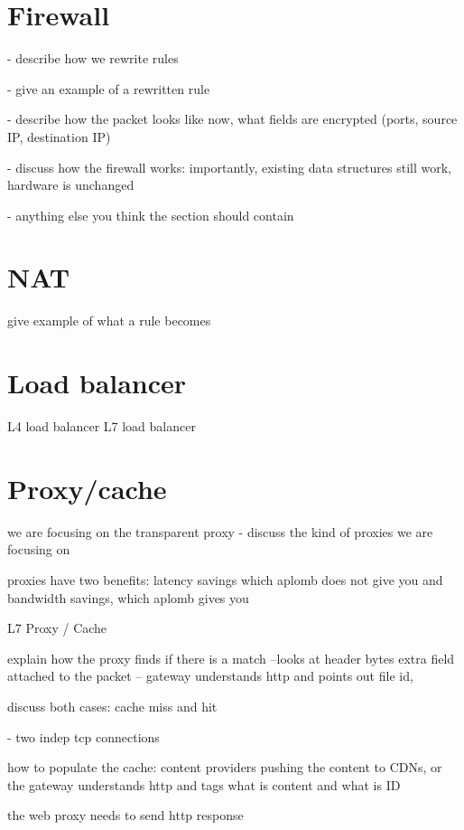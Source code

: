 
\section{Firewall}\label{sec:firewall}

- describe how we rewrite rules 

- give an example of a rewritten rule

- describe how the packet looks like now, what fields are encrypted (ports, source IP, destination IP)

- discuss how the firewall works: importantly, existing data structures still work, hardware is unchanged

- anything else you think the section should contain

\section{NAT}\label{sec:nat}

give example of what a rule becomes

\section{Load balancer}\label{sec:loadb}

L4 load balancer
L7 load balancer

\section{Proxy/cache}\label{sec:proxy}


we are focusing on the transparent proxy
- discuss the kind of proxies we are focusing on

proxies have two benefits: latency savings which aplomb does not give you 
and bandwidth savings, which aplomb gives you
 
L7 Proxy / Cache

explain how the proxy finds if there is  a match --looks at header bytes
extra field attached to the packet -- gateway understands http and points out file id, 

discuss both cases: cache miss and hit

- two indep tcp connections 

how to populate the cache: content providers pushing the content to CDNs, or the gateway understands
http and tags what is content and what is ID

the web proxy needs to send http response 

